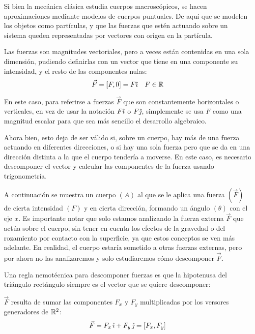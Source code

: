 \documentclass[a5paper,12pt,twoside]{book}
\begin{document}
Si bien la mecánica clásica estudia cuerpos macroscópicos, se hacen aproximaciones mediante modelos de cuerpos puntuales. De aquí que se modelen los objetos como partículas, y que las fuerzas que estén actuando sobre un sistema queden representadas por vectores con origen en la partícula.

Las fuerzas son magnitudes vectoriales, pero a veces están contenidas en una sola dimensión, pudiendo definirlas con un vector que tiene en una componente su intensidad, y el resto de las componentes nulas:
\[
  \Vec{F} = \left[ F,0 \right] = F \hat{\imath} \quad F \in \mathbb{R}
\]

En este caso, para referirse a fuerzas $\Vec{F}$ que son constantemente horizontales o verticales, en vez de usar la notación $F \hat{\imath}$ o $F \hat{\jmath}$, simplemente se usa $F$ como una magnitud escalar para que sea más sencillo el desarrollo algebraico.

Ahora bien, esto deja de ser válido si, sobre un cuerpo, hay más de una fuerza actuando en diferentes direcciones, o si hay una sola fuerza pero que se da en una dirección distinta a la que el cuerpo tendería a moverse. En este caso, es necesario descomponer el vector y calcular las componentes de la fuerza usando trigonometría.

A continuación se muestra un cuerpo $(A)$ al que se le aplica una fuerza $(\Vec{F})$ de cierta intensidad $(F)$ y en cierta dirección, formando un ángulo $(\theta)$ con el eje $x$. Es importante notar que solo estamos analizando la fuerza externa $\Vec{F}$ que actúa sobre el cuerpo, sin tener en cuenta los efectos de la gravedad o del rozamiento por contacto con la superficie, ya que estos conceptos se ven más adelante. En realidad, el cuerpo estaría sometido a otras fuerzas externas, pero por ahora no las analizaremos y solo estudiaremos cómo descomponer $\Vec{F}$.

\begin{center}
    \def\svgwidth{0.7\linewidth}
    
\end{center}

Una regla nemotécnica para descomponer fuerzas es que la hipotenusa del triángulo rectángulo siempre es el vector que se quiere descomponer:

\begin{center}
    \def\svgwidth{0.5\linewidth}
    
\end{center}

$\Vec{F}$ resulta de sumar las componentes $F_x$ y $F_y$ multiplicadas por los versores generadores de $\mathbb{R}^2$:
\[ \Vec{F} = F_x \, \hat{\imath} + F_y \, \hat{\jmath} = [F_x,F_y] \]
\end{document}
